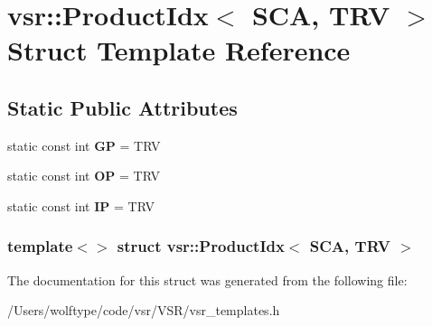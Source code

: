 \hypertarget{structvsr_1_1_product_idx_3_01_s_c_a_00_01_t_r_v_01_4}{\section{vsr\-:\-:Product\-Idx$<$ S\-C\-A, T\-R\-V $>$ Struct Template Reference}
\label{structvsr_1_1_product_idx_3_01_s_c_a_00_01_t_r_v_01_4}
}
\subsection*{Static Public Attributes}
\begin{DoxyCompactItemize}
\item 
\hypertarget{structvsr_1_1_product_idx_3_01_s_c_a_00_01_t_r_v_01_4_ab611d52037c9852835eb7f0eb5f29aff}{static const int {\bfseries G\-P} = T\-R\-V}\label{structvsr_1_1_product_idx_3_01_s_c_a_00_01_t_r_v_01_4_ab611d52037c9852835eb7f0eb5f29aff}

\item 
\hypertarget{structvsr_1_1_product_idx_3_01_s_c_a_00_01_t_r_v_01_4_a722c0d9c16d45ac6552f81062895d6e9}{static const int {\bfseries O\-P} = T\-R\-V}\label{structvsr_1_1_product_idx_3_01_s_c_a_00_01_t_r_v_01_4_a722c0d9c16d45ac6552f81062895d6e9}

\item 
\hypertarget{structvsr_1_1_product_idx_3_01_s_c_a_00_01_t_r_v_01_4_a7aecf282afe35226d3d61fd9427e35ab}{static const int {\bfseries I\-P} = T\-R\-V}\label{structvsr_1_1_product_idx_3_01_s_c_a_00_01_t_r_v_01_4_a7aecf282afe35226d3d61fd9427e35ab}

\end{DoxyCompactItemize}
\subsubsection*{template$<$$>$ struct vsr\-::\-Product\-Idx$<$ S\-C\-A, T\-R\-V $>$}



The documentation for this struct was generated from the following file\-:\begin{DoxyCompactItemize}
\item 
/\-Users/wolftype/code/vsr/\-V\-S\-R/vsr\-\_\-templates.\-h\end{DoxyCompactItemize}
